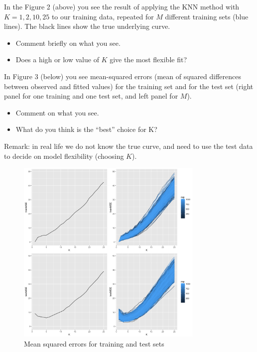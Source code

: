 \documentclass[]{article}
\providecommand{\tightlist}{%
  \setlength{\itemsep}{0pt}\setlength{\parskip}{0pt}}
\begin{document}
In the Figure 2 (above) you see the result of applying the KNN method
with \(K=1,2,10,25\) to our training data, repeated for \(M\) different
training sets (blue lines). The black lines show the true underlying
curve.

\begin{itemize}
\tightlist
\item
  Comment briefly on what you see.
\item
  Does a high or low value of \(K\) give the most flexible fit?
\end{itemize}

In Figure 3 (below) you see mean-squared errors (mean of squared
differences between observed and fitted values) for the training set and
for the test set (right panel for one training and one test set, and
left panel for \(M\)).

\begin{itemize}
\tightlist
\item
  Comment on what you see.
\item
  What do you think is the ``best'' choice for K?
\end{itemize}

Remark: in real life we do not know the true curve, and need to use the
test data to decide on model flexibility (choosing \(K\)).

\begin{figure}
\centering
\includegraphics[width=0.80000\textwidth]{Prob1f3.png}
\caption{Mean squared errors for training and test sets}
\end{figure}
\end{document}
